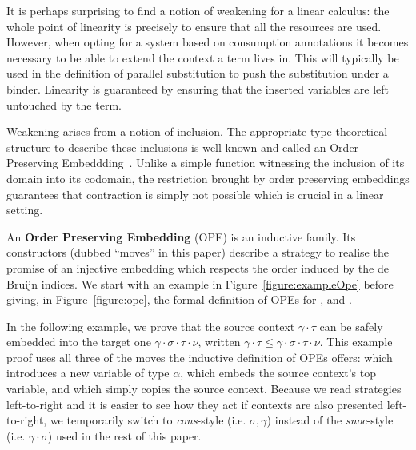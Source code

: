 It is perhaps surprising to find a notion of weakening for a linear
calculus: the whole point of linearity is precisely to ensure that
all the resources are used. However, when opting for a system based
on consumption annotations it becomes necessary to be able to extend
the context a term lives in. This will typically be used in the definition
of parallel substitution to push the substitution under a binder. Linearity
is guaranteed by ensuring that the inserted variables are left untouched by
the term.

Weakening arises from a notion of inclusion. The appropriate type
theoretical structure to describe these inclusions is well-known
and called an Order Preserving Embeddding~\cite{chapman2009thesis,altenkirch1995categorical}.
Unlike a simple function witnessing the inclusion of its domain
into its codomain, the restriction brought by order preserving
embeddings guarantees that contraction is simply not possible which
is crucial in a linear setting.

\begin{definition}
An \textbf{Order Preserving Embedding} (OPE) is an inductive family. Its
constructors (dubbed ``moves'' in this paper) describe a strategy to realise
the promise of an injective embedding which respects the order induced by
the de Bruijn indices. We start with an example in Figure~\ref{figure:exampleOpe}
before giving, in Figure~\ref{figure:ope}, the formal definition of OPEs for
\Nat{}, \Context{} and \Usages{}.
\end{definition}

In the following example, we prove that the source context $\gamma \ensuremath{\cdot} \tau$
can be safely embedded into the target one $\gamma \ensuremath{\cdot} \sigma \ensuremath{\cdot} \tau \ensuremath{\cdot} \nu$,
written $\gamma \ensuremath{\cdot} \tau \leq \gamma \ensuremath{\cdot} \sigma \ensuremath{\cdot} \tau \ensuremath{\cdot} \nu$. This example proof
uses all three of the moves the inductive definition of OPEs offers:
\opeinsert{\alpha} which introduces a new variable of type $\alpha$,
\opecopy{} which embeds the source context's top variable, and \opedone{}
which simply copies the source context. Because we read
strategies left-to-right and it is easier to see how they act if contexts
are also presented left-to-right, we temporarily switch to \emph{cons}-style
(i.e. $\sigma , \gamma$) instead of the \emph{snoc}-style (i.e. $\gamma \ensuremath{\cdot} \sigma$)
used in the rest of this paper.

